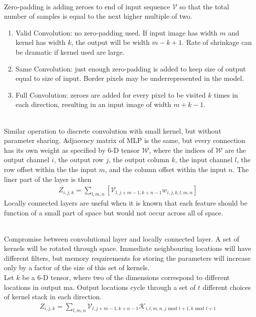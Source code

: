 \begin{remark} \\
Zero-padding is adding zeroes to end of input sequence $\mathcal{V}$ so that the total number of samples is equal to the next higher multiple of two.
\begin{enumerate}[label=\roman*.]
\setlength{\itemsep}{0pt}
\item Valid Convolution: no zero-padding used. If input image has width $m$ and kernel has width $k$, the output will be width $m-k+1$. Rate of shrinkage can be dramatic if kernel used are large.
\item Same Convolution: just enough zero-padding is added to keep size of output equal to size of input. Border pixels may be underrepresented in the model.
\item Full Convolution: zeroes are added for every pixel to be visited $k$ times in each direction, resulting in an input image of width $m+k-1$.
\end{enumerate}
\end{remark}

\begin{remark} \\
Similar operation to discrete convolution with small kernel, but without parameter sharing. Adjacency matrix of MLP is the same, but every connection has its own weight as specified by $6$-D tensor $\mathcal{W}$, where the indices of $\mathcal{W}$ are the output channel $i$, the output row $j$, the output column $k$, the input channel $l$, the row offset within the the input $m$, and the column offset within the input $n$. The liner part of the layer is then
\begin{align}
Z_{i,j,k} = \sum\limits_{l,m,n} [\mathcal{V}_{l, j+m-1, k+n-1} w_{i,j,k,l,m,n}] \nonumber
\end{align}
Locally connected layers are useful when it is known that each feature should be function of a small part of space but would not occur across all of space.
\end{remark}

\begin{remark} \\
Compromise between convolutional layer and locally connected layer. A set of kernels will be rotated through space. Immediate neighbouring locations will have different filters, but memory requirements for storing the parameters will increase only by a factor of the size of this set of kernels.\\
Let $k$ be a $6$-D tensor, where two of the dimensions correspond to different locations in output ma. Output locations cycle through a set of $t$ different choices of kernel stack in each direction.
\begin{align}
Z_{i,j,k} = \sum\limits_{l,m,n} \mathcal{V}_{l, j+m-1, k+n-1} \mathcal{K}_{i,l,m,n, j \text{ mod } t + 1, k \text{ mod } t + 1} \nonumber
\end{align}  
\end{remark}
